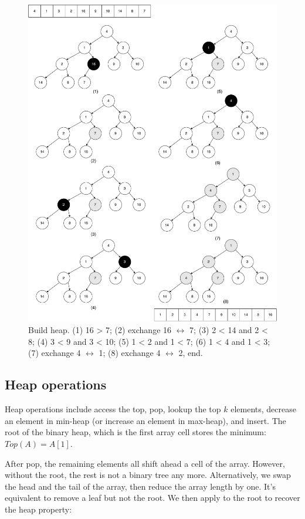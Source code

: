 \documentclass[b5paper]{article}
\begin{document}
\begin{figure}[htbp]
  \centering
  \includegraphics[scale=0.4]{img/build-heap}
  \caption{Build heap. (1) 16 > 7; (2) exchange 16 $\leftrightarrow$ 7; (3) 2 < 14 and 2 < 8; (4) 3 < 9 and 3 < 10; (5) 1 < 2 and 1 < 7; (6) 1 < 4 and 1 < 3; (7) exchange 4 $\leftrightarrow$ 1; (8) exchange 4 $\leftrightarrow$ 2, end.}
  \label{fig:build-heap-3}
\end{figure}

\subsection{Heap operations}

Heap operations include access the top, pop, lookup the top $k$ elements, decrease an element in min-heap (or increase an element in max-heap), and insert. The root of the binary heap, which is the first array cell stores the minimum: $Top(A) = A[1]$.

After pop, the remaining elements all shift ahead a cell of the array. However, without the root, the rest is not a binary tree any more. Alternatively, we swap the head and the tail of the array, then reduce the array length by one. It's equivalent to remove a leaf but not the root. We then apply  to the root to recover the heap property:
\end{document}
